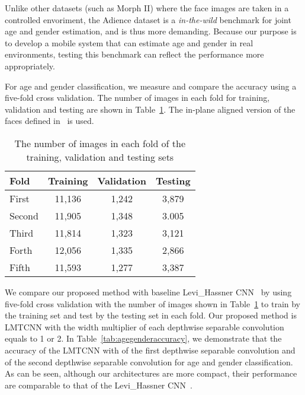 \documentclass[times, 10pt,twocolumn]{article}
\begin{document}
Unlike other datasets (such as Morph II) where the face images are taken in a controlled envoriment, the Adience dataset is a \emph{in-the-wild} benchmark for joint age and gender estimation, and is thus more demanding.
Because our purpose is to develop a mobile system that can estimate age and gender in real environments, testing this benchmark can reflect the performance more appropriately.



For age and gender classification, we measure and compare the accuracy using a five-fold cross validation. The number of images in each fold for training, validation and testing are shown in Table~\ref{tab:numberfivefolds}. The in-plane aligned version of the faces defined in~\cite{eidinger2014age} is used.

\begin{table}[]
\centering
\caption{The number of images in each fold of the training, validation and testing sets }
\label{tab:numberfivefolds}
\begin{tabular}{@{}lccc@{}}
\toprule
Fold   & Training  &  Validation & Testing \\ \midrule
First   & 11,136    &  1,242      & 3,879 \\
Second  & 11,905    &  1,348      & 3.005 \\
Third   & 11,814    &  1,323      & 3,121 \\
Forth   & 12,056    &  1,335      & 2,866 \\
Fifth   & 11,593    &  1,277      & 3,387 \\ \bottomrule
\end{tabular}
\end{table}

We compare our proposed method with baseline Levi\_Hassner CNN~\cite{levi2015age} by using five-fold cross validation with the number of images shown in Table~\ref{tab:numberfivefolds} to train by the training set and test by the testing set in each fold. Our proposed method is LMTCNN with the width multiplier of each depthwise separable convolution equals to 1 or 2. In Table~\ref{tab:agegenderaccuracy}, we demonstrate that the accuracy of the LMTCNN with  of the first depthwise separable convolution and  of the second depthwise separable convolution for age and gender classification.
As can be seen, although our architectures are more compact, their performance are comparable to that of the Levi\_Hassner CNN~\cite{levi2015age}.
\end{document}
